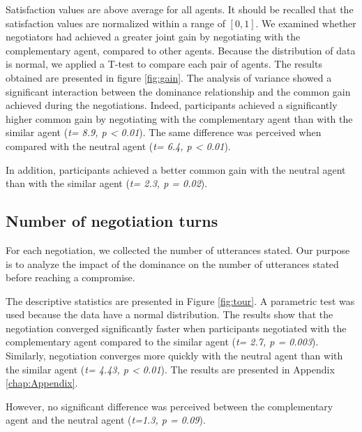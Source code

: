\documentclass[10pt, a4paper]{article} %
\begin{document}
	Satisfaction values are above average for all agents. It should be recalled that the satisfaction values are normalized within a range of $[0, 1] $. We examined whether negotiators had achieved a greater joint gain by negotiating with the complementary agent, compared to other agents. Because the  distribution of data is normal, we applied a T-test to compare each pair of agents. The results obtained are presented in figure \ref{fig:gain}. The analysis of variance showed a significant interaction between the dominance relationship and the common gain achieved during the negotiations. Indeed, participants achieved a significantly higher common gain by negotiating with the complementary agent than with the similar agent (\emph{t= 8.9, p < 0.01}). The same difference was perceived when compared with the neutral agent (\emph{t= 6.4, p < 0.01}).
	
	In addition, participants achieved a better common gain with the neutral agent than with the similar agent (\emph{t= 2.3, p = 0.02}).
	
	\subsection{Number of negotiation turns}
	
	For each negotiation, we collected the number of utterances stated. Our purpose is to analyze the impact of the dominance on the number of utterances stated before reaching a compromise. 
	
	The descriptive statistics are presented in Figure \ref{fig:tour}. A parametric test was used because the data have a normal distribution. The results show that the negotiation converged significantly faster when participants negotiated with the complementary agent compared to the similar agent (\emph{t= 2.7, p = 0.003}). Similarly, negotiation converges more quickly with the neutral agent than with the similar agent (\emph{t= 4.43, p < 0.01}).  The results are presented in Appendix \ref{chap:Appendix}.
	
	However, no significant difference was perceived between the complementary agent and the neutral agent (\emph{t=1.3, p = 0.09}).
\end{document}

